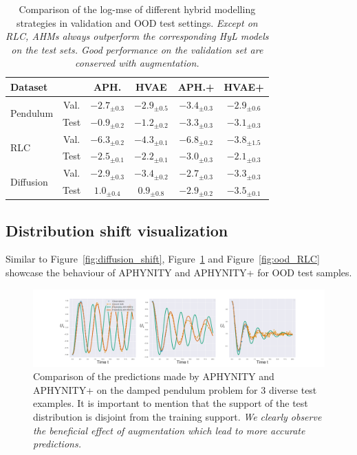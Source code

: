 \documentclass{article}
\newcommand\figref{Figure~\ref}
\begin{document}
\begin{table}[H]
    \small
    \centering
    \setlength{\tabcolsep}{4pt}
    \begin{tabular}{l c| c c | c c}
        Dataset & & APH. & HVAE & APH.+ & HVAE+ \\ \hline
       \multirow{2}{*}{Pendulum} & Val. & $-2.7_{\pm 0.3}$ & $-2.9_{\pm 0.5}$ & $-3.4_{\pm 0.3}$ & $-2.9_{\pm 0.6}$  \\
                            & Test   & $-0.9_{\pm 0.2}$ & $-1.2_{\pm 0.2}$ & $-3.3_{\pm 0.3}$ & $-3.1_{\pm 0.3}$  \\ \hline
       \multirow{2}{*}{RLC} & Val. & $-6.3_{\pm 0.2}$ & $-4.3_{\pm 0.1}$ & $-6.8_{\pm 0.2}$ & $-3.8_{\pm 1.5}$ \\
                            & Test  & $-2.5_{\pm 0.1}$ & $-2.2_{\pm 0.1}$ & $-3.0_{\pm 0.3}$ & $-2.1_{\pm 0.3}$\\ \hline
       \multirow{2}{*}{Diffusion} & Val. & $-2.9_{\pm 0.3}$ & $-3.4_{\pm 0.2}$ & $-2.7_{\pm 0.3}$ & $-3.3_{\pm 0.3}$  \\
                                & Test & $1.0_{\pm 0.4}$ & $0.9_{\pm 0.8}$ & $-2.9_{\pm 0.2}$ & $-3.5_{\pm 0.1}$ \\ \hline
    \end{tabular}
    \caption{Comparison of the log-mse of different hybrid modelling strategies in validation and OOD test settings. \textit{Except on RLC, AHMs always outperform the corresponding HyL models on the test sets. Good performance on the validation set are conserved with augmentation.}}
    \label{tab:synth_log_mse}
\end{table}
\subsection{Distribution shift visualization}
Similar to \figref{fig:diffusion_shift}, \figref{fig:ood_pendulum} and \figref{fig:ood_RLC} showcase the behaviour of APHYNITY and APHYNITY+ for OOD test samples.
\begin{figure}
    \centering
    \includegraphics[width=.98\textwidth]{figures/pendulum_examples.png}
    \vspace{-1em}
    \caption{Comparison of the predictions made by APHYNITY and APHYNITY+ on the damped pendulum problem for 3 diverse test examples. It is important to mention that the support of the test distribution is disjoint from the training support. \textit{We clearly observe the beneficial effect of augmentation which lead to more accurate predictions.}}
    \label{fig:ood_pendulum}
\end{figure}
\end{document}
